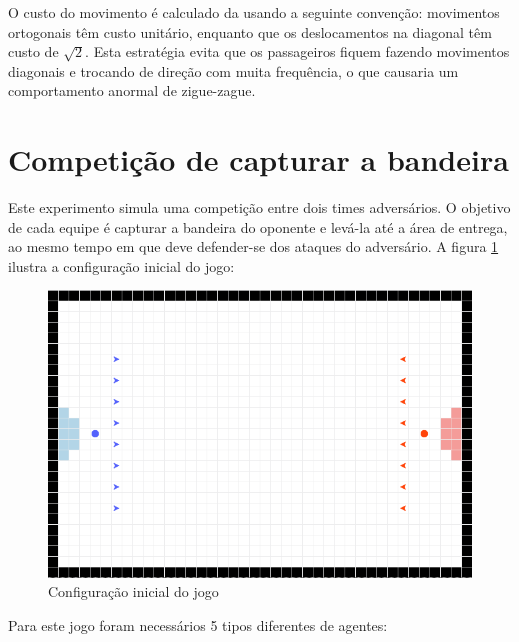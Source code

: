 \documentclass[preprint,12pt]{elsarticle}
\begin{document}
O custo do movimento é calculado da usando a seguinte convenção: movimentos ortogonais têm custo unitário, enquanto que os deslocamentos na diagonal têm custo de $\sqrt{2}$. Esta estratégia evita que os passageiros fiquem fazendo movimentos diagonais e trocando de direção com muita frequência, o que causaria um comportamento anormal de zigue-zague.

\section{Competição de capturar a bandeira}
\label{sec:sim2}

Este experimento simula uma competição entre dois times adversários. O objetivo de cada equipe é capturar a bandeira do oponente e levá-la até a área de entrega, ao mesmo tempo em que deve defender-se dos ataques do adversário. A figura \ref{fig:flag-ini} ilustra a configuração inicial do jogo:

\begin{figure}[H]
	\centering
	\includegraphics[totalheight=5cm]{figures/flag-ini.png}
	\caption{Configuração inicial do jogo}
	\label{fig:flag-ini}
\end{figure}

Para este jogo foram necessários 5 tipos diferentes de agentes:
\end{document}
